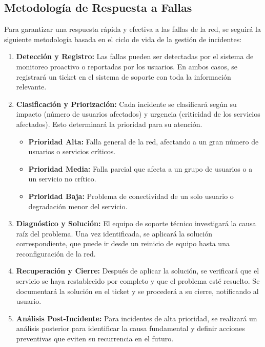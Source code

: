 \subsection{Metodología de Respuesta a Fallas}

Para garantizar una respuesta rápida y efectiva a las fallas de la red, se seguirá la siguiente metodología basada en el ciclo de vida de la gestión de incidentes:

\begin{enumerate}
    \item \textbf{Detección y Registro:} Las fallas pueden ser detectadas por el sistema de monitoreo proactivo o reportadas por los usuarios. En ambos casos, se registrará un ticket en el sistema de soporte con toda la información relevante.
    \item \textbf{Clasificación y Priorización:} Cada incidente se clasificará según su impacto (número de usuarios afectados) y urgencia (criticidad de los servicios afectados). Esto determinará la prioridad para su atención.
    \begin{itemize}
        \item \textbf{Prioridad Alta:} Falla general de la red, afectando a un gran número de usuarios o servicios críticos.
        \item \textbf{Prioridad Media:} Falla parcial que afecta a un grupo de usuarios o a un servicio no crítico.
        \item \textbf{Prioridad Baja:} Problema de conectividad de un solo usuario o degradación menor del servicio.
    \end{itemize}
    \item \textbf{Diagnóstico y Solución:} El equipo de soporte técnico investigará la causa raíz del problema. Una vez identificada, se aplicará la solución correspondiente, que puede ir desde un reinicio de equipo hasta una reconfiguración de la red.
    \item \textbf{Recuperación y Cierre:} Después de aplicar la solución, se verificará que el servicio se haya restablecido por completo y que el problema esté resuelto. Se documentará la solución en el ticket y se procederá a su cierre, notificando al usuario.
    \item \textbf{Análisis Post-Incidente:} Para incidentes de alta prioridad, se realizará un análisis posterior para identificar la causa fundamental y definir acciones preventivas que eviten su recurrencia en el futuro.
\end{enumerate}
